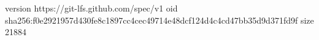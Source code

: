 version https://git-lfs.github.com/spec/v1
oid sha256:f0e2921957d430fe8c1897cc4cec49714e48dcf124d4c4cd47bb35d9d371fd9f
size 21884

